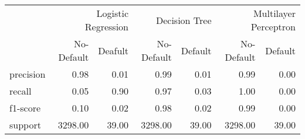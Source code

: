 \begin{table}
\thcenter
\begin{tabular}{lrrrrrr}
 & \multicolumn{2}{r}{Logistic Regression} & \multicolumn{2}{r}{Decision Tree  } & \multicolumn{2}{r}{Multilayer Perceptron} \\
 & No-Default & Deafult & No-Default & Default & No-Default & Default \\
precision & 0.98 & 0.01 & 0.99 & 0.01 & 0.99 & 0.00 \\
recall & 0.05 & 0.90 & 0.97 & 0.03 & 1.00 & 0.00 \\
f1-score & 0.10 & 0.02 & 0.98 & 0.02 & 0.99 & 0.00 \\
support & 3298.00 & 39.00 & 3298.00 & 39.00 & 3298.00 & 39.00 \\
\end{tabular}
\end{table}

